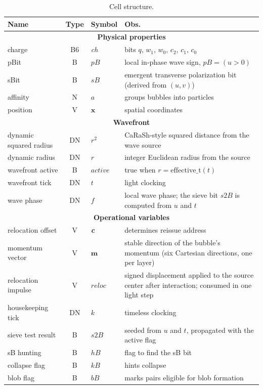 \documentclass{ijuc}
\begin{document}
\begin{table}
\begin{centering}
\begin{tabular}{|l|c|l|l|}
\hline 
\textbf{\large{}Name} & \textbf{\large{}Type} & \textbf{\large{}Symbol} & \textbf{\large{}Obs.}\tabularnewline
\hline 
\hline 
\multicolumn{4}{|c|}{\textbf{Physical properties}}\tabularnewline
\hline 
charge & B6 & \emph{ch} & bits $q$, $w_{1}$, $w_{0}$, $c_{2}$, $c_{1}$, $c_{0}$\tabularnewline
\hline 
pBit & B & $pB$ & local in-phase wave sign, $pB=(u>0)$\tabularnewline
\hline 
sBit & B & $sB$ & emergent transverse polarization bit (derived from $(u,v)$)\tabularnewline
\hline 
affinity & N & $a$ & groups bubbles into particles\tabularnewline
\hline 
position & V & $\boldsymbol{x}$ & spatial coordinates\tabularnewline
\hline 
\multicolumn{4}{|c|}{\textbf{Wavefront}}\tabularnewline
\hline 
dynamic squared radius & DN & $r^{2}$ & CaRaSh-style squared distance from the wave source\tabularnewline
\hline 
dynamic radius & DN & $r$ & integer Euclidean radius from the source\tabularnewline
\hline 
wavefront active & B & $\mathit{active}$ & true when $r=\mathrm{effective\_t}(t)$\tabularnewline
\hline 
wavefront tick & DN & $t$ & light clocking\tabularnewline
\hline 
wave phase & DN & $f$ & local wave phase; the sieve bit $s2B$ is computed from $u$ and $t$\tabularnewline
\hline 
\multicolumn{4}{|c|}{\textbf{Operational variables}}\tabularnewline
\hline 
relocation offset & V & \textbf{\emph{c}} & determines reissue address\tabularnewline
\hline
momentum vector & V & $\boldsymbol{m}$ & stable direction of the bubble's momentum (six Cartesian directions, one per layer)\tabularnewline
\hline
relocation impulse & V & $\boldsymbol{\mathit{reloc}}$ & signed displacement applied to the source center after interaction; consumed in one light step\tabularnewline
\hline
housekeeping tick & DN & $k$ & timeless clocking\tabularnewline
\hline 
sieve test result & B & $s2B$ & seeded from $u$ and $t$, propagated with the active flag\tabularnewline
\hline 
sB hunting & B & $hB$ & flag to find the sB bit\tabularnewline
\hline 
collapse flag & B & $kB$ & hints collapse\tabularnewline
\hline 
blob flag & B & $bB$ & marks pairs eligible for blob formation\tabularnewline
\hline 

\end{tabular}
\par\end{centering}

\caption{Cell structure.}


\end{table}
\end{document}
